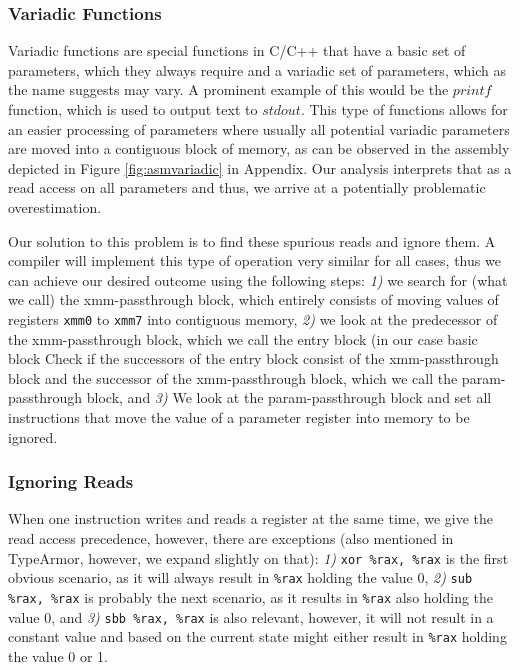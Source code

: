 \subsubsection{Variadic Functions}
\label{subsection:variadicfunctions}

Variadic functions are special functions in C/C++ that have a basic set of parameters, 
which they always require and a variadic set of parameters, which as the name suggests 
may vary. A prominent example of this would be the $printf$ function, which is used 
to output text to $stdout$.
This type of functions allows for an easier processing of parameters where
usually all potential variadic parameters are moved into a contiguous block of memory, 
as can be observed in the assembly depicted in Figure \ref{fig:asmvariadic} in Appendix.
Our analysis interprets that as a read access on all parameters and thus,
we arrive at a potentially problematic overestimation. 

Our solution to this problem is to find these spurious reads and ignore them. A compiler will implement this type of operation very 
similar for all cases, thus we can achieve our desired outcome using the following steps:
\textit{1)} we search for (what we call) the xmm-passthrough block, which entirely consists of moving values of registers \texttt{xmm0} to \texttt{xmm7} into contiguous memory, %
\textit{2)} we look at the predecessor of the xmm-passthrough block, which we call the entry block (in our case basic block %
Check if the successors of the entry block consist of the xmm-passthrough block and the successor of the 
xmm-passthrough block, which we call the param-passthrough block, and
\textit{3)} We look at the param-passthrough block and set all instructions that move the value of a parameter register into memory to be ignored. %

\subsubsection{Ignoring Reads} When one instruction writes and reads a register at the same time, we give the read access precedence, however, there are exceptions (also mentioned in TypeArmor, however, we expand slightly on that):
\textit{1)} \texttt{xor \%rax, \%rax} is the first obvious scenario, as it will always result in \texttt{\%rax} holding the value 0,
\textit{2)} \texttt{sub \%rax, \%rax} is probably the next scenario, as it results in \texttt{\%rax} also holding the value 0, and
\textit{3)} \texttt{sbb \%rax, \%rax} is also relevant, however, it will not result in a constant value and based on the current state might either result in \texttt{\%rax} holding the value 0 or 1.

